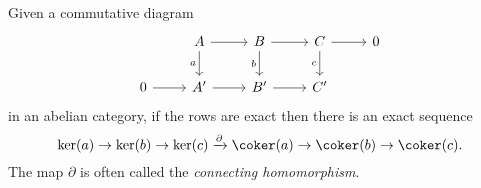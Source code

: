 \begin{lem}[name=Snake lemma]
Given a commutative diagram 
\[\begin{tikzcd}
	& A & B & C & 0 \\
	0 & {A'} & {B'} & {C'}
	\arrow[from=1-2, to=1-3]
	\arrow["a"', from=1-2, to=2-2]
	\arrow[from=1-3, to=1-4]
	\arrow["b"', from=1-3, to=2-3]
	\arrow[from=1-4, to=1-5]
	\arrow["c"', from=1-4, to=2-4]
	\arrow[from=2-1, to=2-2]
	\arrow[from=2-2, to=2-3]
	\arrow[from=2-3, to=2-4]
\end{tikzcd}\] in an abelian category, if the rows are exact then there is an exact sequence \[
	\ker (a) \to \ker (b) \to \ker (c) \xrightarrow{\partial} \coker (a) \to \coker (b) \to \coker (c).
\] The map $\partial$ is often called the \emph{connecting homomorphism}. 
\end{lem}

